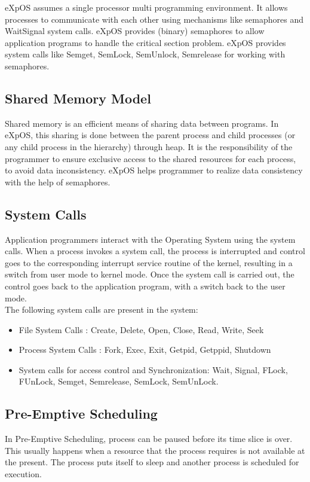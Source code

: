 \documentclass[10pt]{article}
\begin{document}
eXpOS assumes a single processor multi programming environment. It allows processes to communicate with each other using mechanisms like semaphores and Wait\-Signal system calls.
eXpOS provides (binary) semaphores to allow application programs to handle the critical section problem. eXpOS provides system calls like Semget, SemLock, SemUnlock, Semrelease for working with semaphores.
\subsection{Shared Memory Model}

Shared memory is an efficient means of sharing data between programs. In eXpOS, this sharing is done between the parent process and child processes (or any child process in the hierarchy) through heap. It is the responsibility of the programmer to ensure exclusive access to the shared resources for each process, to avoid data inconsistency. eXpOS helps programmer to realize data consistency with the help of semaphores. 
\subsection{System Calls}

Application programmers interact with the Operating System using the system calls. When a process invokes a system call, the process is interrupted and control goes to the corresponding interrupt service routine of the kernel, resulting in a switch from user mode to kernel mode. Once the system call is carried out, the control goes back to the application program, with a switch back to the user mode.\\
The following system calls are present in the system: 
\begin{itemize}
\item File System Calls : Create, Delete, Open, Close, Read, Write, Seek
\item Process System Calls : Fork, Exec, Exit, Getpid, Getppid, Shutdown
\item System calls for access control and Synchronization: Wait, Signal, FLock, FUnLock, Semget, Semrelease, SemLock, SemUnLock.
\end{itemize}

\subsection{Pre-Emptive Scheduling}

In Pre-Emptive Scheduling, process can be paused before its time slice is over. This usually happens when a resource that the process requires is not available at the present. The process puts itself to sleep and another process is scheduled for execution.
\end{document}
